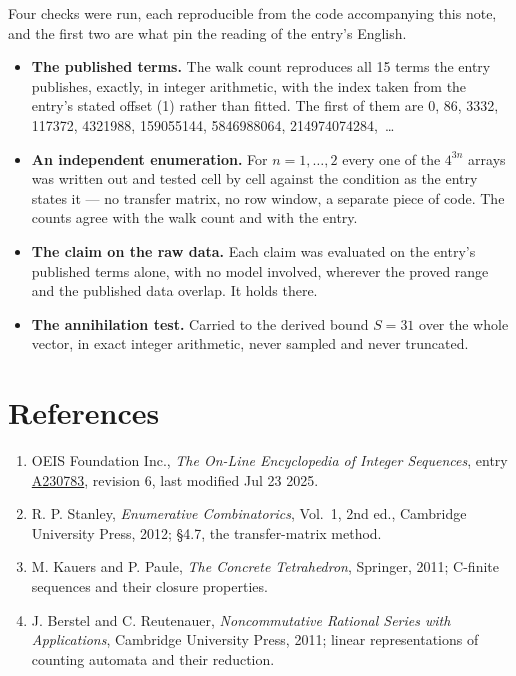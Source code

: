 \documentclass[11pt]{article}
\theoremstyle{definition}
\begin{document}
Four checks were run, each reproducible from the code accompanying this note, and the first two are what pin the reading of the entry's English.

\begin{itemize}

\item {\bfseries The published terms.} The walk count reproduces all 15 terms the entry publishes, exactly, in integer arithmetic, with the index taken from the entry's stated offset (1) rather than fitted. The first of them are 0, 86, 3332, 117372, 4321988, 159055144, 5846988064, 214974074284,~\dots

\item {\bfseries An independent enumeration.} For $n = 1,\dots,2$ every one of the $4^{3n}$ arrays was written out and tested cell by cell against the condition as the entry states it --- no transfer matrix, no row window, a separate piece of code. The counts agree with the walk count and with the entry.

\item {\bfseries The claim on the raw data.} Each claim was evaluated on the entry's published terms alone, with no model involved, wherever the proved range and the published data overlap. It holds there.

\item {\bfseries The annihilation test.} Carried to the derived bound $S = 31$ over the whole vector, in exact integer arithmetic, never sampled and never truncated.

\end{itemize}

\section{References}

\begin{enumerate}

\item OEIS Foundation Inc., \emph{The On-Line Encyclopedia of Integer Sequences}, entry \href{https://oeis.org/A230783}{A230783}, revision 6, last modified Jul 23 2025.

\item R. P. Stanley, \emph{Enumerative Combinatorics}, Vol.~1, 2nd ed., Cambridge University Press, 2012; \S4.7, the transfer-matrix method.

\item M. Kauers and P. Paule, \emph{The Concrete Tetrahedron}, Springer, 2011; C-finite sequences and their closure properties.

\item J. Berstel and C. Reutenauer, \emph{Noncommutative Rational Series with Applications}, Cambridge University Press, 2011; linear representations of counting automata and their reduction.

\end{enumerate}
\end{document}
